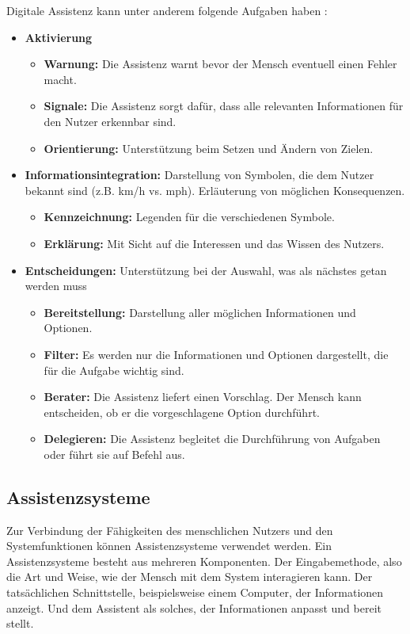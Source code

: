 Digitale Assistenz kann unter anderem folgende Aufgaben haben \cite{Wandke2005}:
\begin{itemize}
\item \textbf{Aktivierung}
	\begin{itemize}
	\item \textbf{Warnung:} Die Assistenz warnt bevor der Mensch eventuell einen Fehler macht.
	\item \textbf{Signale:} Die Assistenz sorgt dafür, dass alle relevanten Informationen für den Nutzer erkennbar sind.
	\item \textbf{Orientierung:} Unterstützung beim Setzen und Ändern von Zielen.
	\end{itemize}
\item \textbf{Informationsintegration:} Darstellung von Symbolen, die dem Nutzer bekannt sind (z.B. km/h vs. mph). Erläuterung von möglichen Konsequenzen.
	\begin{itemize}
	\item \textbf{Kennzeichnung:} Legenden für die verschiedenen Symbole.
	\item \textbf{Erklärung:} Mit Sicht auf die Interessen und das Wissen des Nutzers.
	\end{itemize}
\item \textbf{Entscheidungen:} Unterstützung bei der Auswahl, was als nächstes getan werden muss
	\begin{itemize}
	\item \textbf{Bereitstellung:} Darstellung aller möglichen Informationen und Optionen.
	\item \textbf{Filter:} Es werden nur die Informationen und Optionen dargestellt, die für die Aufgabe wichtig sind.
	\item \textbf{Berater:} Die Assistenz liefert einen Vorschlag. Der Mensch kann entscheiden, ob er die vorgeschlagene Option durchführt.
	\item \textbf{Delegieren:} Die Assistenz begleitet die Durchführung von Aufgaben oder führt sie auf Befehl aus.
	\end{itemize}
\end{itemize}

\subsection{Assistenzsysteme}
\label{Assistenzsysteme}
Zur Verbindung der Fähigkeiten des menschlichen Nutzers und den Systemfunktionen können Assistenzsysteme verwendet werden. Ein Assistenzsysteme besteht aus mehreren Komponenten. Der Eingabemethode, also die Art und Weise, wie der Mensch mit dem System interagieren kann. Der tatsächlichen Schnittstelle, beispielsweise einem Computer, der Informationen anzeigt. Und dem Assistent als solches, der Informationen anpasst und bereit stellt.

